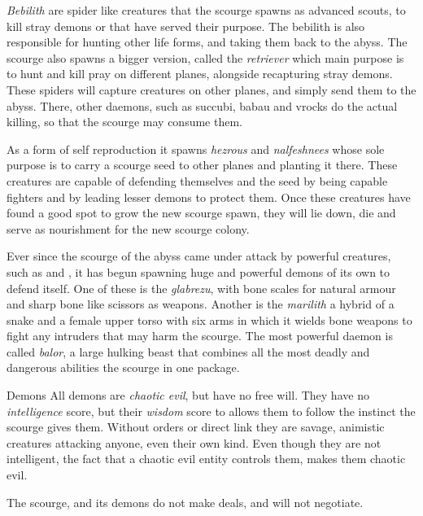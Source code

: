 \emph{Bebilith} are spider like creatures that the scourge spawns as advanced
scouts, to kill stray demons or that have served their purpose. The bebilith
is also responsible for hunting other life forms, and taking them back to the
abyss. The scourge also spawns a bigger version, called the \emph{retriever}
which main purpose is to hunt and kill pray on different planes, alongside
recapturing stray demons. These spiders will capture creatures on other planes,
and simply send them to the abyss. There, other daemons, such as succubi,
babau and vrocks do the actual killing, so that the scourge may consume them.

As a form of self reproduction it spawns \emph{hezrous} and \emph{nalfeshnees}
whose sole purpose is to carry a scourge seed to other planes and planting
it there. These creatures are capable of defending themselves and the seed
by being capable fighters and by leading lesser demons to protect them. Once
these creatures have found a good spot to grow the new scourge spawn, they
will lie down, die and serve as nourishment for the new scourge colony.

Ever since the scourge of the abyss came under attack by powerful creatures,
such as  and , it has begun spawning
huge and powerful demons of its own to defend itself. One of these is the
\emph{glabrezu}, with bone scales for natural armour and sharp bone like
scissors as weapons. Another is the \emph{marilith} a hybrid of a snake and
a female upper torso with six arms in which it wields bone weapons to fight
any intruders that may harm the scourge. The most powerful daemon is called
\emph{balor}, a large hulking beast that combines all the most deadly and
dangerous abilities the scourge in one package.

\begin{35e}{Demons}
  All demons are \emph{chaotic evil}, but have no free will. They
  have no \emph{intelligence} score, but their \emph{wisdom} score to allows
  them to follow the instinct the scourge gives them. Without orders or direct
  link they are savage, animistic creatures attacking anyone, even their own
  kind. Even though they are not intelligent, the fact that a chaotic evil
  entity controls them, makes them chaotic evil.

  The scourge, and its demons do not make deals, and will not negotiate.
\end{35e}
